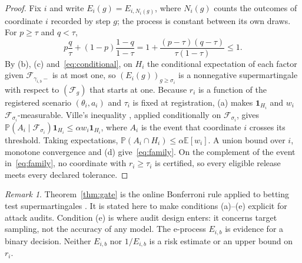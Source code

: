 \documentclass{jpc}
\theoremstyle{remark}
\newtheorem{remark}[thm]{Remark}
\newcommand{\Prob}{\mathbb P}
\newcommand{\E}{\mathbb E}
\newcommand{\F}{\mathcal F}
\begin{document}
\begin{proof}
Fix $i$ and write $E_i(g)=E_{i,N_i(g)}$, where $N_i(g)$ counts the outcomes of coordinate $i$ recorded by step $g$; the process is constant between its own draws. For $p\ge\tau$ and $q<\tau$,
\[
p\frac q\tau+(1-p)\frac{1-q}{1-\tau}=1+\frac{(p-\tau)(q-\tau)}{\tau(1-\tau)}\le1 .
\]
By (b), (c) and~\eqref{eq:conditional}, on $H_i$ the conditional expectation of each factor given $\F_{\gamma_{i,b}-}$ is at most one, so $(E_i(g))_{g\ge\sigma_i}$ is a nonnegative supermartingale with respect to $(\F_g)$ that starts at one. Because $r_i$ is a function of the registered scenario $(\theta_i,a_i)$ and $\tau_i$ is fixed at registration, (a) makes $\mathbf 1_{H_i}$ and $w_i$ $\F_{\sigma_i}$-measurable. Ville's inequality \cite{ville1939}, applied conditionally on $\F_{\sigma_i}$, gives $\Prob(A_i\mid\F_{\sigma_i})\mathbf 1_{H_i}\le\alpha w_i\mathbf 1_{H_i}$, where $A_i$ is the event that coordinate $i$ crosses its threshold. Taking expectations, $\Prob(A_i\cap H_i)\le\alpha\E[w_i]$. A union bound over $i$, monotone convergence and (d) give~\eqref{eq:family}. On the complement of the event in~\eqref{eq:family}, no coordinate with $r_i\ge\tau_i$ is certified, so every eligible release meets every declared tolerance.
\end{proof}

\begin{remark}
Theorem~\ref{thm:gate} is the online Bonferroni rule \cite{tian2021} applied to betting test supermartingales \cite{shafer2011,waudby2024}. It is stated here to make conditions (a)--(e) explicit for attack audits. Condition (e) is where audit design enters: it concerns target sampling, not the accuracy of any model. The e-process $E_{i,b}$ is evidence for a binary decision. Neither $E_{i,b}$ nor $1/E_{i,b}$ is a risk estimate or an upper bound on $r_i$.
\end{remark}
\end{document}
